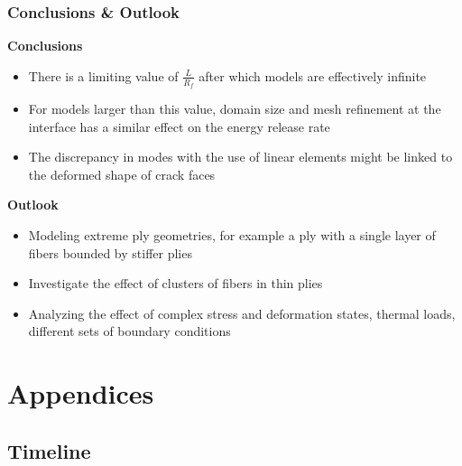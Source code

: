 \documentclass[first,firstsupp,lastsupp,last,hyperref,table]{ETHclass}
\begin{document}
\begin{frame}
\frametitle{\vspace*{0.5cm}\small Conclusions \& Outlook}
\vspace{-0.75cm}
\centering
\scriptsize
\begin{alertblock}{\footnotesize \bf{Conclusions}}
\begin{itemize}[label=]
  \item There is a limiting value of $\frac{L}{R_{f}}$ after which models are effectively infinite
	\item For models larger than this value, domain size and mesh refinement at the interface has a similar effect on the energy release rate
  \item The discrepancy in modes with the use of linear elements might be linked to the deformed shape of crack faces
\end{itemize}
\end{alertblock}
\begin{alertblock}{\footnotesize \bf{Outlook}}
\begin{itemize}[label=]
	\item Modeling extreme ply geometries, for example a ply with a single layer of fibers bounded by stiffer plies\\[9pt]
	\item Investigate the effect of clusters of fibers in thin plies\\[9pt]
	\item Analyzing the effect of complex stress and deformation states, thermal loads, different sets of boundary conditions
\end{itemize}
\end{alertblock}
\end{frame}

\section{Appendices}

\subsection{Timeline}
\end{document}
